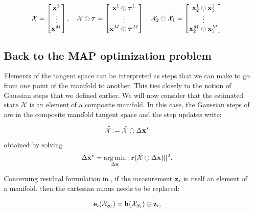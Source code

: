\begin{equation}
    \mathcal{X}=
    \begin{bmatrix}
        {\bf x}^1 \\
        \vdots \\
        {\bf x}^M
    \end{bmatrix},
    \quad
    \mathcal{X} \oplus {\bm \tau}
    =
    \begin{bmatrix}
        {\bf x}^1 \oplus {\bm \tau}^1 \\
        \vdots \\
        {\bf x}^M \oplus {\bm \tau}^M
    \end{bmatrix}
    \quad
    \mathcal{X}_2 \ominus \mathcal{X}_1
    =
    \begin{bmatrix}
        {\bf x}^1_2 \ominus {\bf x}^1_1 \\
        \vdots \\
        {\bf x}^M_2 \ominus {\bf x}^M_1
    \end{bmatrix}
\end{equation}



\subsection{Back to the MAP optimization problem}
\label{sec:manifold_GN}
Elements of the tangent space can be interpreted as steps that we can make to go from one point of the manifold to another.
This ties closely to the notion of Gaussian steps that we defined earlier. We will now consider that the estimated state $\mathcal{X}$
is an element of a composite manifold. In this case, the Gaussian steps of 
are in the composite manifold tangent space and the step updates write:

\begin{equation}
    \check{\mathcal{X}} := \check{\mathcal{X}} \oplus \Delta {\bf x}^*
\end{equation}
%
obtained by solving
%
\begin{equation}
    \Delta {\bf x}^* = \operatorname*{arg\,min}_{\Delta {\bf x}} ||{\bf r}(\check{\mathcal{X}} \oplus \Delta {\bf x})||^2.
\end{equation}


Concerning residual formulation in , if the measurement ${\bf z}_i$ is itself an element of a manifold, then the cartesian minus needs to be replaced:

\begin{equation}
    {\bf e}_i(\mathcal{X}_{S_i}) = {\bf h}(\mathcal{X}_{S_i}) \ominus {\bf z}_i,
\end{equation}


